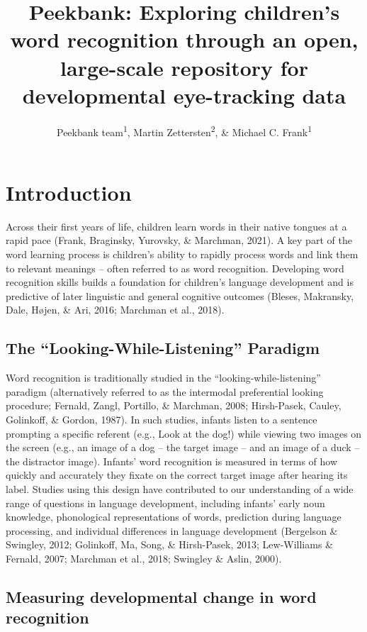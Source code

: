 \documentclass[
  english,
  man]{apa6}
\title{Peekbank: Exploring children's word recognition through an open, large-scale repository for developmental eye-tracking data}
\author{Peekbank team\textsuperscript{1}, Martin Zettersten\textsuperscript{2}, \& Michael C. Frank\textsuperscript{1}}
\date{}
\affiliation{\vspace{0.5cm}\textsuperscript{1} Stanford University\\\textsuperscript{2} Princeton University}
\begin{document}
\maketitle

\hypertarget{introduction}{%
\section{Introduction}\label{introduction}}

Across their first years of life, children learn words in their native tongues at a rapid pace (Frank, Braginsky, Yurovsky, \& Marchman, 2021).
A key part of the word learning process is children's ability to rapidly process words and link them to relevant meanings -- often referred to as word recognition.
Developing word recognition skills builds a foundation for children's language development and is predictive of later linguistic and general cognitive outcomes (Bleses, Makransky, Dale, Højen, \& Ari, 2016; Marchman et al., 2018).

\hypertarget{the-looking-while-listening-paradigm}{%
\subsection{The ``Looking-While-Listening'' Paradigm}\label{the-looking-while-listening-paradigm}}

Word recognition is traditionally studied in the ``looking-while-listening'' paradigm (alternatively referred to as the intermodal preferential looking procedure; Fernald, Zangl, Portillo, \& Marchman, 2008; Hirsh-Pasek, Cauley, Golinkoff, \& Gordon, 1987). In such studies, infants listen to a sentence prompting a specific referent (e.g., Look at the dog!) while viewing two images on the screen (e.g., an image of a dog -- the target image -- and an image of a duck -- the distractor image). Infants' word recognition is measured in terms of how quickly and accurately they fixate on the correct target image after hearing its label. Studies using this design have contributed to our understanding of a wide range of questions in language development, including infants' early noun knowledge, phonological representations of words, prediction during language processing, and individual differences in language development (Bergelson \& Swingley, 2012; Golinkoff, Ma, Song, \& Hirsh-Pasek, 2013; Lew-Williams \& Fernald, 2007; Marchman et al., 2018; Swingley \& Aslin, 2000).

\hypertarget{measuring-developmental-change-in-word-recognition}{%
\subsection{Measuring developmental change in word recognition}\label{measuring-developmental-change-in-word-recognition}}
\end{document}

